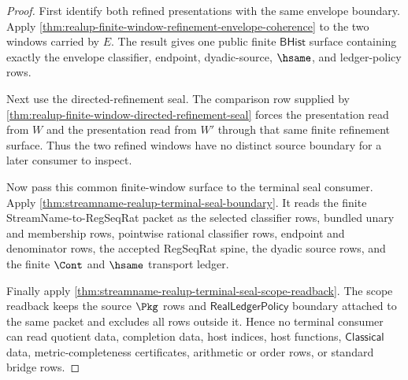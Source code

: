 \begin{proof}
First identify both refined presentations with the same envelope boundary.
Apply
\autoref{thm:realup-finite-window-refinement-envelope-coherence} to the two
windows carried by $E$. The result gives one public finite $\mathsf{BHist}$
surface containing exactly the envelope classifier, endpoint, dyadic-source,
$\hsame$, and ledger-policy rows.

Next use the directed-refinement seal. The comparison row supplied by
\autoref{thm:realup-finite-window-directed-refinement-seal} forces the
presentation read from $W$ and the presentation read from $W'$ through that
same finite refinement surface. Thus the two refined windows have no distinct
source boundary for a later consumer to inspect.

Now pass this common finite-window surface to the terminal seal consumer.
Apply \autoref{thm:streamname-realup-terminal-seal-boundary}. It reads the
finite StreamName-to-RegSeqRat packet as the selected classifier rows, bundled
unary and membership rows, pointwise rational classifier rows, endpoint and
denominator rows, the accepted RegSeqRat spine, the dyadic source rows, and
the finite $\Cont$ and $\hsame$ transport ledger.

Finally apply \autoref{thm:streamname-realup-terminal-seal-scope-readback}.
The scope readback keeps the source $\Pkg$ rows and
$\mathsf{RealLedgerPolicy}$ boundary attached to the same packet and excludes
all rows outside it. Hence no terminal consumer can read quotient data,
completion data, host indices, host functions, $\mathsf{Classical}$ data,
metric-completeness certificates, arithmetic or order rows, or standard
bridge rows.
\end{proof}

